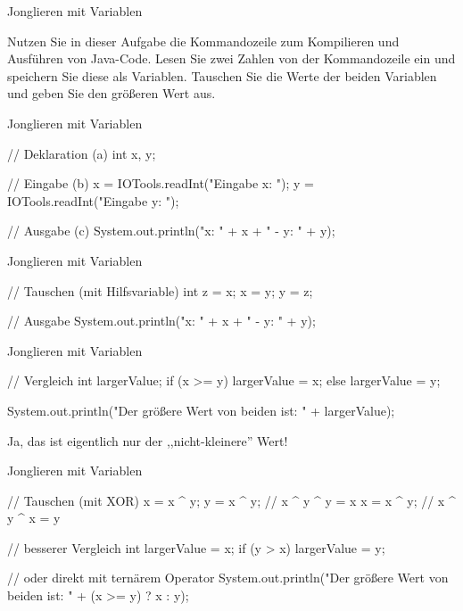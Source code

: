 \begin{frame}[fragile]{Jonglieren mit Variablen}
    \begin{exercise}
    Nutzen Sie in dieser Aufgabe die Kommandozeile zum Kompilieren und Ausführen von Java-Code.
    \medskip
    Lesen Sie zwei Zahlen von der Kommandozeile ein und speichern Sie diese als Variablen. Tauschen Sie die Werte der beiden Variablen und geben Sie den größeren Wert aus.
    \end{exercise}
\end{frame}
\begin{frame}[fragile]{Jonglieren mit Variablen}
    \begin{solve}[a) + b) + c)]
    \begin{plainjava}
// Deklaration (a)
int x, y;

// Eingabe (b)
x = IOTools.readInt("Eingabe x: ");
y = IOTools.readInt("Eingabe y: ");

// Ausgabe (c)
System.out.println("x: " + x + " - y: " + y);
    \end{plainjava}
    \end{solve}
\end{frame}
\resetframecounters
\begin{frame}[fragile]{Jonglieren mit Variablen}
    \begin{solve}[d)]
    \begin{plainjava}
// Tauschen (mit Hilfsvariable)
int z = x;
x = y;
y = z;

// Ausgabe
System.out.println("x: " + x + " - y: " + y);
    \end{plainjava}
    \end{solve}
\end{frame}
\resetframecounters
\begin{frame}[fragile]{Jonglieren mit Variablen}
    \begin{solve}[e)]
    \begin{plainjava}
// Vergleich
int largerValue;
if (x >= y)
    largerValue = x;
else
    largerValue = y;

System.out.println("Der größere Wert von beiden ist: " + largerValue);
    \end{plainjava}
\end{solve}
Ja, das ist eigentlich nur der ,,nicht-kleinere'' Wert!
\end{frame}
\resetframecounters
\begin{frame}[fragile]{Jonglieren mit Variablen}
    \vspace{-0.5\baselineskip}
    \begin{solve}
    \begin{plainjava}
// Tauschen (mit XOR)
x = x ^ y;
y = x ^ y; // x ^ y ^ y = x
x = x ^ y; // x ^ y ^ x = y

// besserer Vergleich
int largerValue = x;
if (y > x) largerValue = y;

// oder direkt mit ternärem Operator
System.out.println("Der größere Wert von beiden ist: " + (x >= y) ? x : y);
    \end{plainjava}
    \end{solve}
\end{frame}